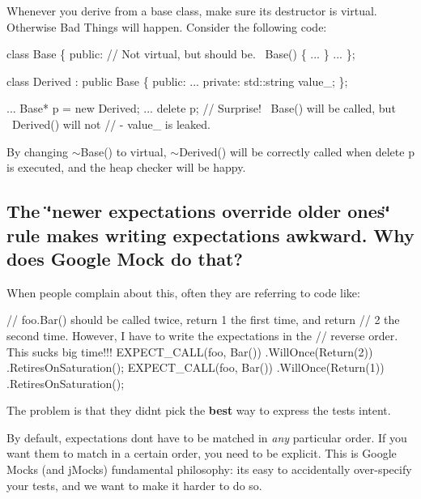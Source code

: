 Whenever you derive from a base class, make sure its destructor is virtual. Otherwise Bad Things will happen. Consider the following code\+:


\begin{DoxyCode}
\textcolor{keyword}{class }Base \{
 \textcolor{keyword}{public}:
  \textcolor{comment}{// Not virtual, but should be.}
  ~Base() \{ ... \}
  ...
\};

\textcolor{keyword}{class }Derived : \textcolor{keyword}{public} Base \{
 \textcolor{keyword}{public}:
  ...
 \textcolor{keyword}{private}:
  std::string value\_;
\};

...
  Base* p = \textcolor{keyword}{new} Derived;
  ...
  \textcolor{keyword}{delete} p;  \textcolor{comment}{// Surprise! ~Base() will be called, but ~Derived() will not}
             \textcolor{comment}{// - value\_ is leaked.}
\end{DoxyCode}


By changing {\ttfamily $\sim$\+Base()} to virtual, {\ttfamily $\sim$\+Derived()} will be correctly called when {\ttfamily delete p} is executed, and the heap checker will be happy.

\subsection*{The \char`\"{}newer expectations override older ones\char`\"{} rule makes writing expectations awkward. Why does Google Mock do that?}

When people complain about this, often they are referring to code like\+:


\begin{DoxyCode}
\textcolor{comment}{// foo.Bar() should be called twice, return 1 the first time, and return}
\textcolor{comment}{// 2 the second time.  However, I have to write the expectations in the}
\textcolor{comment}{// reverse order.  This sucks big time!!!}
EXPECT\_CALL(foo, Bar())
    .WillOnce(Return(2))
    .RetiresOnSaturation();
EXPECT\_CALL(foo, Bar())
    .WillOnce(Return(1))
    .RetiresOnSaturation();
\end{DoxyCode}


The problem is that they didn\textquotesingle{}t pick the {\bfseries best} way to express the test\textquotesingle{}s intent.

By default, expectations don\textquotesingle{}t have to be matched in {\itshape any} particular order. If you want them to match in a certain order, you need to be explicit. This is Google Mock\textquotesingle{}s (and j\+Mock\textquotesingle{}s) fundamental philosophy\+: it\textquotesingle{}s easy to accidentally over-\/specify your tests, and we want to make it harder to do so.

